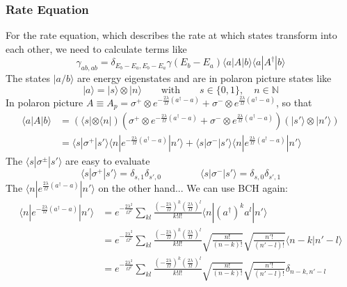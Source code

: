 	\subsubsection{Rate Equation}
	For the rate equation, which describes the rate at which states transform into each other, we need to calculate terms like
	\begin{equation}
		\gamma_{ab,ab} =	\delta_{E_b - E_a, E_b - E_a} \gamma \left(E_b - E_a \right) \langle a | A | b \rangle \langle a | A^\dagger | b \rangle
	\end{equation}
	The states $|a / b\rangle$ are energy eigenstates and are in polaron picture states like
	\begin{equation}
		|a\rangle =	|s\rangle \otimes |n\rangle \qquad \text{with} \qquad s \in \{0, 1\}, \quad n \in \mathbb{N}
	\end{equation}
	In polaron picture $A \equiv A_p =	\sigma^+ \otimes e^{- \frac{2 \lambda}{\Omega} (a^\dagger -a)} + \sigma^- \otimes e^{\frac{2 \lambda}{\Omega} (a^\dagger -a)} $, so that
	\begin{align*}
		\langle a | A | b \rangle &=	\left(\langle s | \otimes \langle n | \right) \left(\sigma^+ \otimes e^{- \frac{2 \lambda}{\Omega} (a^\dagger -a)} + \sigma^- \otimes e^{\frac{2 \lambda}{\Omega} (a^\dagger -a)}\right) (|s'\rangle \otimes |n'\rangle) \\
		&= \langle s | \sigma^+ | s' \rangle \langle n | e^{- \frac{2 \lambda}{\Omega} (a^\dagger -a)} | n' \rangle + \langle s | \sigma^- | s' \rangle \langle n | e^{ \frac{2 \lambda}{\Omega} (a^\dagger -a)} | n' \rangle
	\end{align*}
	The $\langle s | \sigma^\pm | s' \rangle$ are easy to evaluate
	\begin{equation}
		\langle s | \sigma^+ | s' \rangle =	\delta_{s, 1} \delta_{s', 0} \qquad \qquad  \langle s | \sigma^- | s' \rangle =	\delta_{s, 0} \delta_{s', 1}
	\end{equation}
	The $\langle n | e^{ \frac{2 \lambda}{\Omega} (a^\dagger -a)} | n' \rangle$ on the other hand...
	We can use BCH again:
	\begin{align}
		\langle n | e^{ -\frac{2 \lambda}{\Omega} (a^\dagger -a)} | n' \rangle &=	e^{-\frac{2\lambda^2}{\Omega^2}} \sum_{kl} \frac{\left(-\frac{2\lambda}{\Omega}\right)^k \left(\frac{2 \lambda}{\Omega} \right)^l}{k! l!} \langle n | \left(a^\dagger\right)^k a^l | n' \rangle \\
		&= e^{-\frac{2\lambda^2}{\Omega^2}} \sum_{kl} \frac{\left(-\frac{2\lambda}{\Omega}\right)^k \left(\frac{2 \lambda}{\Omega} \right)^l}{k! l!} \sqrt{\frac{n!}{(n-k)!}} \sqrt{\frac{n'!}{(n'-l)!}} \langle n - k|n'-l \rangle \\
		&= e^{-\frac{2\lambda^2}{\Omega^2}} \sum_{kl} \frac{\left(-\frac{2\lambda}{\Omega}\right)^k \left(\frac{2 \lambda}{\Omega} \right)^l}{k! l!} \sqrt{\frac{n!}{(n-k)!}} \sqrt{\frac{n'!}{(n'-l)!}} \delta_{n-k, n'-l}
	\end{align}
